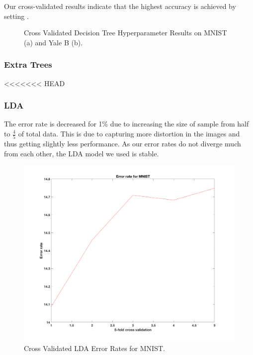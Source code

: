 Our cross-validated results indicate that the highest accuracy is achieved by setting .
%
\begin{figure}[H]
    \centering
    \caption{Cross Validated Decision Tree Hyperparameter Results on MNIST (a) and Yale B (b).}
\end{figure}

\subsubsection{Extra Trees}

<<<<<<< HEAD
\subsubsection{LDA}
The error rate is decreased for 1\% due to increasing the size of sample from half to $\frac{4}{5}$ of total data. This is due to capturing more distortion in the images and thus getting slightly less performance. As our error rates do not diverge much from each other, the LDA model we used is stable. 
\begin{figure}[H]
	\centering\includegraphics[width=0.6\columnwidth]{../images/cr-err-mnist}
	\caption{Cross Validated LDA Error Rates for MNIST.}
\end{figure}

